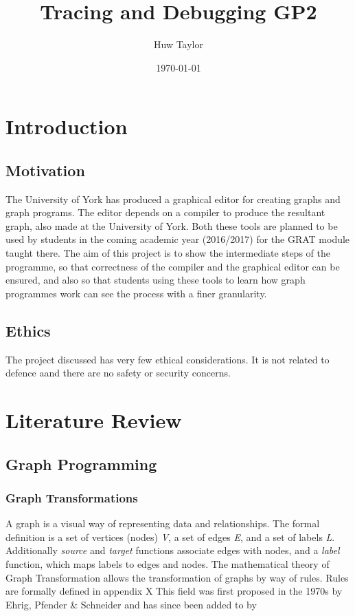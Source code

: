\documentclass{UoYCSproject}
\author{Huw Taylor}
\title{Tracing and Debugging GP2}
\date{\today}
\begin{document}
\maketitle
\tableofcontents
\listoffigures

\chapter{Introduction}
\section{Motivation}
The University of York has produced a graphical editor for creating graphs and graph programs. The editor depends on a compiler to produce the resultant graph, also made at the University of York. Both these tools are planned to be used by students in the coming academic year (2016/2017) for the GRAT module taught there.
The aim of this project is to show the intermediate steps of the programme, so that correctness of the compiler and the graphical editor can be ensured, and also so that students using these tools to learn how graph programmes work can see the process with a finer granularity.
\section{Ethics}
The project discussed has very few ethical considerations. It is not related to defence aand there are no safety or security concerns.

\chapter{Literature Review}
\section{Graph Programming}
\subsection{Graph Transformations}
A graph is a visual way of representing data and relationships. The formal definition is a set of vertices (nodes) \emph{V}, a set of edges \emph{E}, and a set of labels \emph{L}. Additionally \emph{source} and \emph{target} functions associate edges with nodes, and a \emph{label} function, which maps labels to edges and nodes.
The mathematical theory of Graph Transformation allows the transformation of graphs by way of rules.
Rules are formally defined in appendix X %
This field was first proposed in the 1970s by Ehrig, Pfender \& Schneider and has since been added to by %
\end{document}

